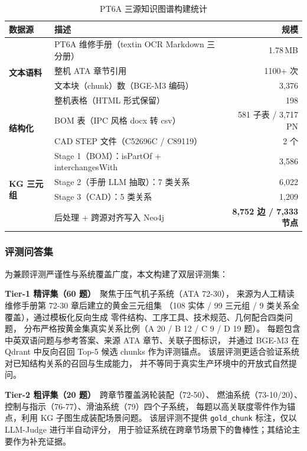 \begin{table}[htbp]
  \centering
  \caption{PT6A 三源知识图谱构建统计}
  \label{tab:dataset-stats}
  \renewcommand{\arraystretch}{1.3}
  \begin{tabularx}{\linewidth}{lXr}
    \toprule
    \textbf{数据源} & \textbf{描述} & \textbf{规模} \\
    \midrule
    \multirow{4}{*}{\textbf{文本语料}}
      & PT6A 维修手册（textin OCR Markdown 三分册） & 1.78\,MB \\
      & 整机 ATA 章节引用 & 1100+ 次 \\
      & 文本块（chunk）数（BGE-M3 编码） & 3{,}376 \\
      & 整机表格（HTML 形式保留） & 198 \\
    \midrule
    \multirow{2}{*}{\textbf{结构化}}
      & BOM 表（IPC 风格 docx 转 csv） & 581 子表 / 3{,}717 PN \\
      & CAD STEP 文件（C52696C / C89119） & 2 个 \\
    \midrule
    \multirow{4}{*}{\textbf{KG 三元组}}
      & Stage 1（BOM）：isPartOf + interchangesWith & 3{,}586 \\
      & Stage 2（手册 LLM 抽取）：7 类关系 & 6{,}022 \\
      & Stage 3（CAD）：5 类关系 & 1{,}209 \\
      & 后处理 + 跨源对齐写入 Neo4j & \textbf{8{,}752 边 / 7{,}333 节点} \\
    \bottomrule
  \end{tabularx}
\end{table}

\subsubsection{评测问答集}

为兼顾评测严谨性与系统覆盖广度，本文构建了双层评测集：

\textbf{Tier-1 精评集（60 题）}~聚焦于压气机子系统（ATA 72-30），
来源为人工精读维修手册第 72-30 章后建立的黄金三元组集
（108 实体 / 99 三元组 / 9 类关系全覆盖），通过模板化反向生成
零件结构、工序工具、技术规范、几何配合四类问题，
分布严格按黄金集真实关系比例（A 20 / B 12 / C 9 / D 19 题）。
每题包含中英双语问题与参考答案、来源 ATA 章节、关联子图标识，
并通过 BGE-M3 在 Qdrant 中反向召回 Top-5 候选 chunks 作为评测锚点。
该层评测更适合验证系统对已知结构关系的召回与生成能力，
并不等同于真实生产环境中的开放式自然提问。

\textbf{Tier-2 粗评集（20 题）}~跨章节覆盖涡轮装配（72-50）、
燃油系统（73-10/20）、控制与指示（76-77）、滑油系统（79）四个子系统，
每题以高关联度零件作为锚点，利用 KG 子图生成装配场景问题。
该层评测不提供 \texttt{gold\_chunk} 标注，仅以 LLM-Judge 进行半自动评分，
用于验证系统在跨章节场景下的鲁棒性；其结论主要作为补充证据。

